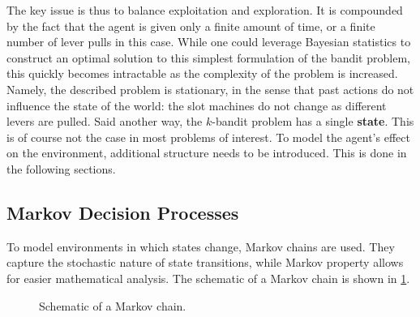The key issue is thus to balance exploitation and exploration.
It is compounded by the fact that the agent is given only a finite amount of time,
or a finite number of lever pulls in this case.
While one could leverage Bayesian statistics to construct an optimal solution to this 
simplest formulation of the bandit problem, this quickly becomes intractable as the complexity of
the problem is increased.
Namely, the described problem is stationary, in the sense that past actions do not influence 
the state of the world: the slot machines do not change as different levers are pulled.
Said another way, the $ k  $-bandit problem has a single \textbf{state}.
This is of course not the case in most problems of interest.
To model the agent's effect on the environment, additional structure needs to be introduced.
This is done in the following sections.

 
\subsection{Markov Decision Processes}
\label{subsec-mdps}
To model environments in which states change, Markov chains are used.
They capture the stochastic nature of state transitions, while Markov property 
allows for easier mathematical analysis.
The schematic of a Markov chain is shown in \ref{fig:markov-chain}.

\begin{figure}[htpb]
\begin{center}
\end{center}
\caption{Schematic of a Markov chain.}
\label{fig:markov-chain}
\end{figure}


